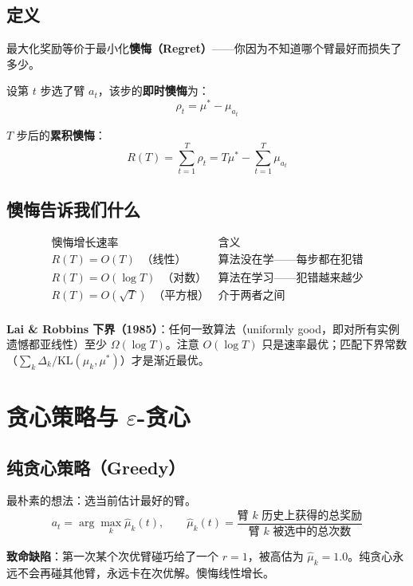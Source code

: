 \documentclass{article}
\begin{document}
\subsection*{定义}

最大化奖励等价于最小化\textbf{懊悔（Regret）}——你因为不知道哪个臂最好而损失了多少。

设第 $t$ 步选了臂 $a_t$，该步的\textbf{即时懊悔}为：
\[
\boxed{\rho_t = \mu^* - \mu_{a_t}}
\]

$T$ 步后的\textbf{累积懊悔}：
\[
\boxed{R(T) = \sum_{t=1}^{T} \rho_t = T\mu^* - \sum_{t=1}^{T} \mu_{a_t}}
\]

\subsection*{懊悔告诉我们什么}

\[
\begin{array}{c|c}
\text{懊悔增长速率} & \text{含义} \\
\hline
R(T) = O(T) \;\; \text{（线性）} & \text{算法没在学——每步都在犯错} \\
R(T) = O(\log T) \;\; \text{（对数）} & \text{算法在学习——犯错越来越少} \\
R(T) = O(\sqrt{T}) \;\; \text{（平方根）} & \text{介于两者之间} \\
\end{array}
\]

\textbf{Lai \& Robbins 下界（1985）}：任何一致算法（uniformly good，即对所有实例遗憾都亚线性）至少 $\Omega(\log T)$。注意 $O(\log T)$ 只是速率最优；匹配下界常数（$\sum_k \Delta_k / \mathrm{KL}(\mu_k,\mu^*)$）才是渐近最优。

\section*{贪心策略与 $\varepsilon$-贪心}

\subsection*{纯贪心策略（Greedy）}

最朴素的想法：选当前估计最好的臂。
\[
a_t = \arg\max_k \hat{\mu}_k(t), \qquad
\hat{\mu}_k(t) = \frac{\text{臂 } k \text{ 历史上获得的总奖励}}{\text{臂 } k \text{ 被选中的总次数}}
\]

\textbf{致命缺陷}：第一次某个次优臂碰巧给了一个 $r=1$，被高估为 $\hat{\mu}_k = 1.0$。纯贪心永远不会再碰其他臂，永远卡在次优解。懊悔线性增长。
\end{document}
